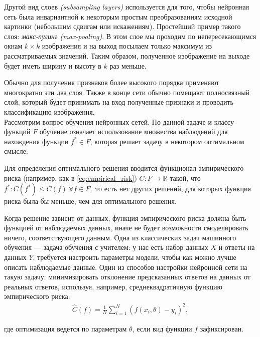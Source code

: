 \documentclass[12pt]{article}
\begin{document}
Другой вид слоев \textit{(subsampling layers)} используется для того, чтобы нейронная сеть была инвариантной к некоторым простым преобразованиям исходной картинки (небольшим сдвигам или искажениям). Простейший пример такого слоя: \textit{макс-пулинг (max-pooling)}. В этом слое мы проходим по непересекающимся окнам $k \times k$ изображения и на выход посылаем только максимум из рассматриваемых значений. Таким образом, полученное изображение на выходе будет иметь ширину и высоту в $k$ раз меньше. 

Обычно для получения признаков более высокого порядка применяют многократно эти два слоя. Также в конце сети обычно помещают полносвязный слой, который будет принимать на вход полученные признаки и проводить классификацию изображения.\\

Рассмотрим вопрос обучения нейронных сетей. По данной задаче и классу функций $F$ обучение означает использование множества наблюдений для нахождения функции $f^* \in F$, которая решает задачу в некотором оптимальном смысле.

Для определения оптимального решения вводится функционал эмпирического риска (например, как в \eqref{eq:empirical_risk}) $C: F \rightarrow \mathbb{R}$ такой, что $f^*: C(f^*) \leq C(f) \ \forall f \in F,$ то есть нет других решений, для которых функция риска была бы меньше, чем для оптимального решения.

Когда решение зависит от данных, функция эмпирического риска должна быть функцией от наблюдаемых данных, иначе не будет возможности смоделировать ничего, соответствующего данным. Одна из классических задач машинного обучения --- задача обучения с учителем: у нас есть набор данных $X$ и ответы на данных $Y$, требуется настроить параметры модели, чтобы как можно лучше описать наблюдаемые данные. Один из способов настройки нейронной сети на такую задачу: минимизировать отклонение предсказанных ответов на данных от реальных ответов, используя, например, среднеквадратичную функцию эмпирического риска: 
\begin{equation}\label{eq:empirical_risk}
\begin{aligned}
\hat{C}(f) =\frac{1}{N}\sum_{i=1}^N \left( f(x_i, \theta)-y_i \right) ^2,
\end{aligned}
\end{equation}

где оптимизация ведется по параметрам $\theta$, если вид функции $f$ зафиксирован.\\
\end{document}
